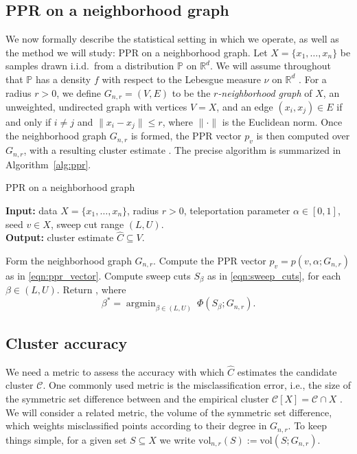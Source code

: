 \documentclass[11pt,twoside]{article}
\newcommand{\Reals}{\mathbb{R}}
\newcommand{\1}{\mathbf{1}}
\DeclareMathOperator*{\argmin}{argmin}
\newcommand{\Rd}{\Reals^d}
\newcommand{\mc}[1]{\mathcal{#1}}
\newcommand{\Pbb}{\mathbb{P}}
\newcommand{\wh}[1]{\widehat{#1}}
\newcommand{\vol}{\mathrm{vol}}
\begin{document}
\subsection{PPR on a neighborhood graph}
\label{subsec:ppr_neighborhood_graph}
We now formally describe the statistical setting in which we operate, as well as the method we will study: PPR on a neighborhood graph. Let $X = \{x_1,\ldots, x_n\}$ be samples drawn i.i.d.\ from a distribution $\Pbb$ on $\Rd$. We will assume throughout that $\Pbb$ has a density $f$ with respect to the Lebesgue measure $\nu$ on $\Rd$ . For a radius $r > 0$, we define $G_{n,r}=(V,E)$ to be the \emph{$r$-neighborhood graph} of $X$, an unweighted, undirected graph with vertices $V=X$, and an edge $(x_i,x_j) \in E$ if and only if $i \neq j$ and $\|x_i - x_j\| \leq r$, where $\|\cdot\|$ is the Euclidean norm. Once the neighborhood graph $G_{n,r}$ is formed, the PPR vector $p_v$ is then computed over $G_{n,r}$, with a resulting cluster estimate \smash{$\wh{C} \subseteq X$}. The precise algorithm is summarized in Algorithm~\ref{alg:ppr}.   

\begin{algorithm}
	\caption{PPR on a neighborhood graph}
	\label{alg:ppr}	
	{\bfseries Input:} data $X=\{x_1,\ldots,x_n\}$, radius $r > 0$, teleportation
	parameter $\alpha \in [0,1]$, seed $v \in X$, sweep cut range $(L,U)$. \\     
	{\bfseries Output:} cluster estimate $\wh{C} \subseteq V$.
	\begin{algorithmic}[1]
		\STATE Form the neighborhood graph $G_{n,r}$.
		\STATE Compute the PPR vector $p_v=p(v, \alpha; G_{n,r})$ as in
		\eqref{eqn:ppr_vector}.  
		\STATE Compute sweep cuts $S_{\beta}$ as in \eqref{eqn:sweep_cuts}, for each $\beta \in (L,U)$.\footnotemark 
		\STATE Return \smash{$\wh{C} = S_{\beta^*}$}, where  
		$$
		\beta^* = \argmin_{\beta \in (L,U)}~ \Phi(S_{\beta}; G_{n,r}).
		$$
	\end{algorithmic}
\end{algorithm}

\subsection{Cluster accuracy}
We need a metric to assess the accuracy with which $\wh{C}$ estimates the candidate cluster $\mc{C}$. One commonly used metric is the misclassification error, i.e., the size of the symmetric set difference between \smash{$\wh{C}$} and the empirical cluster $\mc{C}[X] = \mc{C} \cap X$ \citep{korostelev1993,polonik1995,rigollet2009}. We will consider a related metric, the volume of the symmetric set difference, which weights misclassified points according to their degree in $G_{n,r}$. To keep things simple, for a given set $S \subseteq X$ we write $\vol_{n,r}(S) := \vol(S;G_{n,r})$. 
\end{document}
